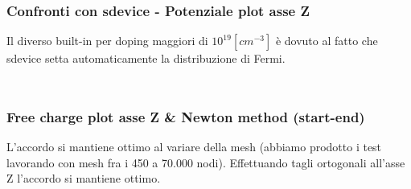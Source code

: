 \begin{frame}
\frametitle{Confronti con sdevice - Potenziale plot asse Z}
Il diverso built-in per doping maggiori di $10^{19}[cm^{-3}]$ \`e dovuto al fatto che sdevice setta automaticamente la distribuzione di Fermi.
\begin{columns}
\begin{column}{0.5 \textwidth}
\begin{center}

\begin{figure}[!h]
         \subfigure[N19P17]
          {\texttt{[image: N1e19\_P1e17]}}
\end{figure}
\end{center}
\end{column}
\begin{column}{0.5 \textwidth}
\begin{center}
\begin{figure}[!h]
         \subfigure[N20P17N19]
          {\texttt{[image: N1e20\_P1e17\_N1e19]}}
\end{figure}
\end{center}
\end{column}
\end{columns}

\end{frame}

\begin{frame}
\frametitle{Free charge plot asse Z \& Newton method (start-end)}
L'accordo si mantiene ottimo al variare della mesh (abbiamo prodotto i test lavorando con mesh fra i 450 a 70.000 nodi). Effettuando tagli ortogonali all'asse Z l'accordo si mantiene ottimo.

\begin{columns}

\begin{column}{0.5 \textwidth}
\begin{figure}[!h]
	  \end{figure}
\end{column}

\begin{column}{0.5 \textwidth}
\begin{figure}[!h]
	  \end{figure}
\end{column}

\end{columns}

\end{frame}


